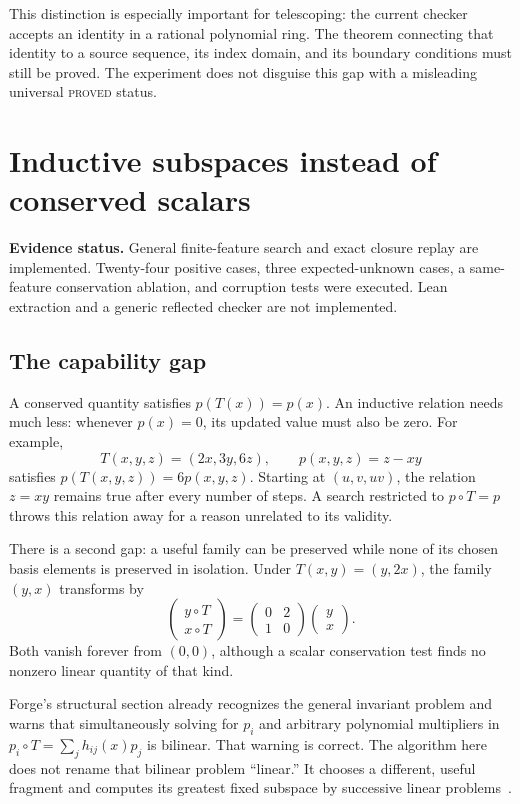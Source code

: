 \documentclass[11pt,letterpaper]{article}
\newcommand{\status}[1]{\par\smallskip\noindent\textbf{Evidence status.} #1\par\smallskip}
\theoremstyle{definition}\newtheorem{definition}[theorem]{Definition}
\theoremstyle{remark}\newtheorem{remark}[theorem]{Remark}
\begin{document}
This distinction is especially important for telescoping: the current checker
accepts an identity in a rational polynomial ring. The theorem connecting that
identity to a source sequence, its index domain, and its boundary conditions
must still be proved. The experiment does not disguise this gap with a
misleading universal \textsc{proved} status.

\section{Inductive subspaces instead of conserved scalars}
\label{sec:invariant}
\status{General finite-feature search and exact closure replay are implemented.
Twenty-four positive cases, three expected-unknown cases, a same-feature
conservation ablation, and corruption tests were executed. Lean extraction and
a generic reflected checker are not implemented.}

\subsection{The capability gap}
A conserved quantity satisfies $p(T(x))=p(x)$. An inductive relation needs much
less: whenever $p(x)=0$, its updated value must also be zero. For example,
\[
 T(x,y,z)=(2x,3y,6z),\qquad p(x,y,z)=z-xy
\]
satisfies $p(T(x,y,z))=6p(x,y,z)$. Starting at $(u,v,uv)$, the relation
$z=xy$ remains true after every number of steps. A search restricted to
$p\circ T=p$ throws this relation away for a reason unrelated to its validity.

There is a second gap: a useful family can be preserved while none of its
chosen basis elements is preserved in isolation. Under $T(x,y)=(y,2x)$, the
family $(y,x)$ transforms by
\[
 \begin{pmatrix}y\circ T\\x\circ T\end{pmatrix}
 =\begin{pmatrix}0&2\\1&0\end{pmatrix}
  \begin{pmatrix}y\\x\end{pmatrix}.
\]
Both vanish forever from $(0,0)$, although a scalar conservation test finds no
nonzero linear quantity of that kind.

Forge's structural section already recognizes the general invariant problem
and warns that simultaneously solving for $p_i$ and arbitrary polynomial
multipliers in $p_i\circ T=\sum_j h_{ij}(x)p_j$ is bilinear. That warning is
correct. The algorithm here does not rename that bilinear problem ``linear.''
It chooses a different, useful fragment and computes its greatest fixed
subspace by successive linear problems~\cite{forge-structural}.
\end{document}

